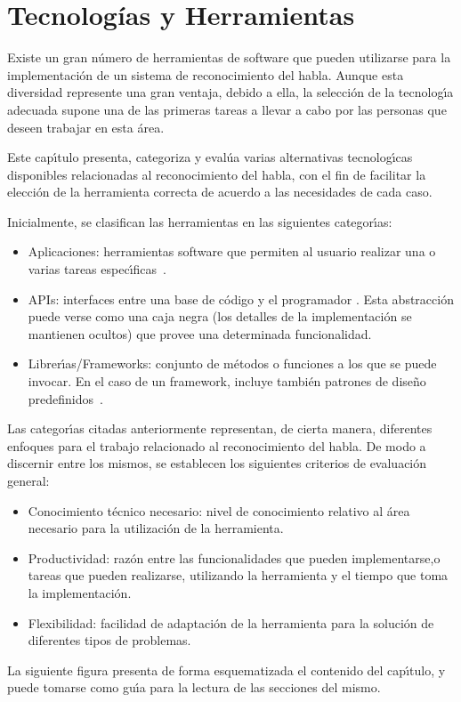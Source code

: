 \chapter{Tecnolog\'ias y Herramientas}
\label{sec:tecnologias}

Existe un gran n\'umero de herramientas de software que pueden utilizarse para la implementaci\'on de un
sistema de reconocimiento del habla. Aunque esta diversidad represente una gran ventaja,
debido a ella, la selecci\'on de la tecnolog{\'\i}a adecuada supone una de las primeras tareas a llevar a
cabo por las personas que deseen trabajar en esta \'area.

Este cap{\'\i}tulo presenta, categoriza y eval\'ua varias alternativas tecnolog{\'\i}cas disponibles relacionadas
al reconocimiento del habla, con el fin de facilitar la elecci\'on de la herramienta correcta
de acuerdo a las necesidades de cada caso.

Inicialmente, se clasifican las herramientas en las siguientes categor{\'\i}as:
\begin{itemize}
	\item Aplicaciones: herramientas software que permiten al usuario realizar una o
	varias tareas \mbox{espec{\'\i}ficas \cite{GoodwillComputer}}.
	\item APIs: interfaces entre una base de c\'odigo y el programador \cite{DoucetteOnApi}. Esta abstracci\'on puede
	verse como una caja negra (los detalles de la implementaci\'on se mantienen ocultos) que
	provee una determinada funcionalidad.
	\item Librer{\'\i}as/Frameworks: conjunto de m\'etodos o funciones a los que se puede invocar.
	En el caso de un framework, incluye tambi\'en patrones de dise\~no
	\mbox{predefinidos \cite{FowlerInversion}}.
\end{itemize}

Las categor{\'\i}as citadas anteriormente representan, de cierta manera, diferentes enfoques para el trabajo
relacionado al reconocimiento del habla. De modo a discernir entre los mismos, se establecen
los siguientes criterios de evaluaci\'on general:
\begin{itemize}
	\item Conocimiento t\'ecnico necesario: nivel de conocimiento relativo al \'area necesario para la
	utilizaci\'on de la herramienta.
	\item Productividad: raz\'on entre las funcionalidades que pueden implementarse,o tareas que pueden
	realizarse, utilizando la herramienta y el tiempo que toma la implementaci\'on.
	\item Flexibilidad: facilidad de adaptaci\'on de la herramienta para la soluci\'on de diferentes
	tipos de problemas.
\end{itemize}

La siguiente figura presenta de forma esquematizada el contenido del cap{\'\i}tulo, y puede tomarse como
gu{\'\i}a para la lectura de las secciones del mismo.





